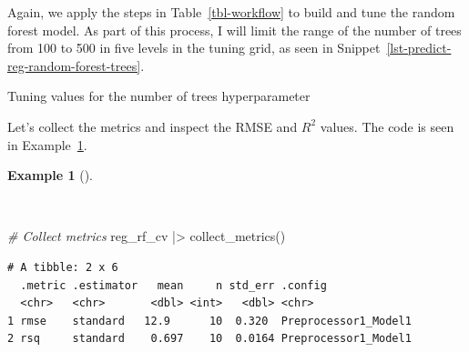 \documentclass[
  letterpaper,
]{book}
\newenvironment{Shaded}{\begin{snugshade}}{\end{snugshade}}
\newcommand{\AttributeTok}[1]{\textcolor[rgb]{0.00,0.00,0.00}{#1}}
\newcommand{\CommentTok}[1]{\textcolor[rgb]{0.00,0.00,0.00}{\textit{#1}}}
\newcommand{\DecValTok}[1]{\textcolor[rgb]{0.00,0.00,0.00}{#1}}
\newcommand{\FunctionTok}[1]{\textcolor[rgb]{0.00,0.00,0.00}{#1}}
\newcommand{\NormalTok}[1]{\textcolor[rgb]{0.00,0.00,0.00}{#1}}
\newcommand{\OtherTok}[1]{\textcolor[rgb]{0.00,0.00,0.00}{#1}}
\newcommand{\SpecialCharTok}[1]{\textcolor[rgb]{0.00,0.00,0.00}{#1}}
\theoremstyle{definition}
\newtheorem{example}{Example}[chapter]
\theoremstyle{remark}
\begin{document}
Again, we apply the steps in Table~\ref{tbl-workflow} to build and tune
the random forest model. As part of this process, I will limit the range
of the number of trees from 100 to 500 in five levels in the tuning
grid, as seen in Snippet~\ref{lst-predict-reg-random-forest-trees}.

\begin{codelisting}

\caption{\label{lst-predict-reg-random-forest-trees}Tuning values for
the number of trees hyperparameter}

\centering{

\begin{Shaded}
\begin{Highlighting}[]
\NormalTok{reg\_grid }\OtherTok{\textless{}{-}}
  \FunctionTok{grid\_regular}\NormalTok{(}\FunctionTok{trees}\NormalTok{(}\AttributeTok{range =} \FunctionTok{c}\NormalTok{(}\DecValTok{100}\NormalTok{, }\DecValTok{500}\NormalTok{)), }\AttributeTok{levels =} \DecValTok{5}\NormalTok{)}
\end{Highlighting}
\end{Shaded}

}

\end{codelisting}%

Let's collect the metrics and inspect the RMSE and \(R^2\) values. The
code is seen in Example~\ref{exm-predict-reg-metrics-rf}.

\begin{example}[]\protect\hypertarget{exm-predict-reg-metrics-rf}{}\label{exm-predict-reg-metrics-rf}

~

\begin{Shaded}
\begin{Highlighting}[]
\CommentTok{\# Collect metrics}
\NormalTok{reg\_rf\_cv }\SpecialCharTok{|\textgreater{}} \FunctionTok{collect\_metrics}\NormalTok{()}
\end{Highlighting}
\end{Shaded}

\begin{verbatim}
# A tibble: 2 x 6
  .metric .estimator   mean     n std_err .config             
  <chr>   <chr>       <dbl> <int>   <dbl> <chr>               
1 rmse    standard   12.9      10  0.320  Preprocessor1_Model1
2 rsq     standard    0.697    10  0.0164 Preprocessor1_Model1
\end{verbatim}

\end{example}
\end{document}
